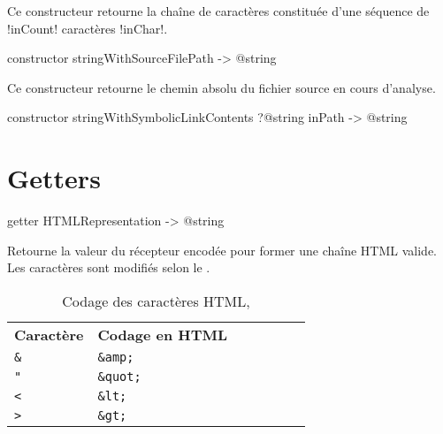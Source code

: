 Ce constructeur retourne la chaîne de caractères constituée d'une séquence de \ggs!inCount! caractères \ggs!inChar!.






\begin{galgasbox}
constructor stringWithSourceFilePath -> @string
\end{galgasbox}

Ce constructeur retourne le chemin absolu du fichier source en cours d'analyse.







\begin{galgasbox}
constructor stringWithSymbolicLinkContents ?@string inPath -> @string
\end{galgasbox}



















\section{Getters}


\begin{galgasbox}
getter HTMLRepresentation -> @string
\end{galgasbox}
Retourne la valeur du récepteur encodée pour former une chaîne HTML valide. Les caractères sont modifiés selon le .


\begin{table}[t]
  \centering
  \begin{tabular}{lllllll}
  \textbf{Caractère} & \textbf{Codage en HTML} \\
  \texttt{\&} & \texttt{\&amp;} \\
  \texttt{"} & \texttt{\&quot;} \\
  \texttt{<} & \texttt{\&lt;} \\
  \texttt{>} & \texttt{\&gt;} \\
  \end{tabular}
  \caption{Codage des caractères HTML, }
  \ligne
\end{table}






